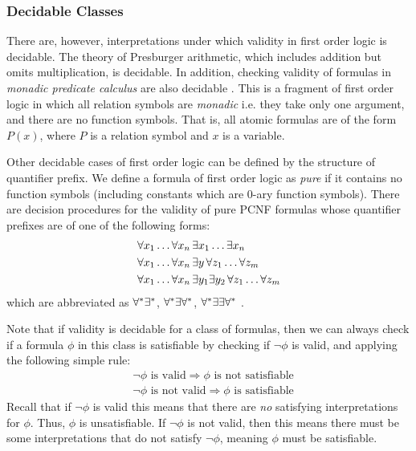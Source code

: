 \documentclass[10pt]{article}
\begin{document}
\subsubsection{Decidable Classes}

There are, however, interpretations under which validity in first order logic is decidable. The theory of Presburger arithmetic, which includes addition but omits multiplication, is decidable. In addition, checking validity of formulas in \textit{monadic predicate calculus} are also decidable \cite{lewis1980complexity}. This is a fragment of first order logic in which all relation symbols are \textit{monadic} i.e. they take only one argument, and there are no function symbols. That is, all atomic formulas are of the form $P(x)$, where $P$ is a relation symbol and $x$ is a variable.

Other decidable cases of first order logic can be defined by the structure of quantifier prefix. We define a formula of first order logic as \textit{pure} if it contains no function symbols (including constants which are 0-ary function symbols). There are decision procedures for the validity of pure PCNF formulas whose quantifier prefixes are of one of the following forms:
\begin{align}
    &\forall x_1\dots\forall x_n \,\exists x_1\dots\exists x_n \\
    &\forall x_1\dots\forall x_n \, \exists y \, \forall z_1\dots\forall z_m \\
    &\forall x_1\dots\forall x_n \, \exists y_1 \exists y_2 \, \forall z_1\dots\forall z_m 
\end{align}  
which are abbreviated as $\forall^*\exists^*$, $\forall^*\exists\forall^*$, $\forall^*\exists\exists\forall^*$ \cite{Dreben1979TheDP}. 

Note that if validity is decidable for a class of formulas, then we can always check if a formula $\phi$ in this class is satisfiable by checking if $\neg \phi$ is valid, and applying the following simple rule:
\begin{align*}
    &\neg \phi \text{ is valid} \Rightarrow \phi \text{ is not satisfiable}\\
    &\neg \phi \text{ is not valid} \Rightarrow \phi \text{ is satisfiable}
\end{align*}
Recall that if $\neg \phi$ is valid this means that there are \textit{no} satisfying interpretations for $\phi$. Thus, $\phi$ is unsatisfiable. If $\neg \phi$ is not valid, then this means there must be some interpretations that do not satisfy $\neg \phi$, meaning $\phi$ must be satisfiable.
\end{document}
